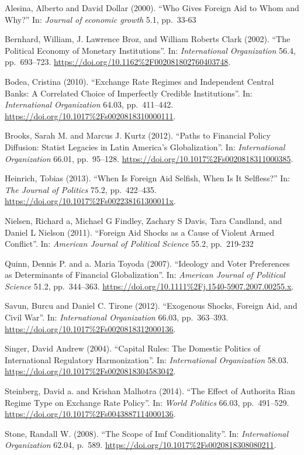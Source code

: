 \documentclass[10pt,]{article}
\begin{document}
Alesina, Alberto and David Dollar (2000). ``Who Gives Foreign Aid to
Whom and Why?'' In: \emph{Journal of economic growth} 5.1, pp.~33-63

Bernhard, William, J. Lawrence Broz, and William Roberts Clark (2002).
``The Political Economy of Monetary Institutions''. In:
\emph{International Organization} 56.4, pp.~693--723.
\url{https://doi.org/10.1162\%2F002081802760403748}.

Bodea, Cristina (2010). ``Exchange Rate Regimes and Independent Central
Banks: A Correlated Choice of Imperfectly Credible Institutions''. In:
\emph{International Organization} 64.03, pp.~411--442.
\url{https://doi.org/10.1017\%2Fs0020818310000111}.

Brooks, Sarah M. and Marcus J. Kurtz (2012). ``Paths to Financial Policy
Diffusion: Statist Legacies in Latin America's Globalization''. In:
\emph{International Organization} 66.01, pp.~95--128.
\url{https://doi.org/10.1017\%2Fs0020818311000385}.

Heinrich, Tobias (2013). ``When Is Foreign Aid Selfish, When Is It
Selfless?'' In: \emph{The Journal of Politics} 75.2, pp.~422--435.
\url{https://doi.org/10.1017\%2Fs002238161300011x}.

Nielsen, Richard a, Michael G Findley, Zachary S Davis, Tara Candland,
and Daniel L Nielson (2011). ``Foreign Aid Shocks as a Cause of Violent
Armed Conflict''. In: \emph{American Journal of Political Science} 55.2,
pp.~219-232

Quinn, Dennis P. and a. Maria Toyoda (2007). ``Ideology and Voter
Preferences as Determinants of Financial Globalization''. In:
\emph{American Journal of Political Science} 51.2, pp.~344--363.
\url{https://doi.org/10.1111\%2Fj.1540-5907.2007.00255.x}.

Savun, Burcu and Daniel C. Tirone (2012). ``Exogenous Shocks, Foreign
Aid, and Civil War''. In: \emph{International Organization} 66.03,
pp.~363--393. \url{https://doi.org/10.1017\%2Fs0020818312000136}.

Singer, David Andrew (2004). ``Capital Rules: The Domestic Politics of
International Regulatory Harmonization''. In:
\emph{International Organization} 58.03.
\url{https://doi.org/10.1017\%2Fs0020818304583042}.

Steinberg, David a. and Krishan Malhotra (2014). ``The Effect of
Authorita Rian Regime Type on Exchange Rate Policy''. In:
\emph{World Politics} 66.03, pp.~491--529.
\url{https://doi.org/10.1017\%2Fs0043887114000136}.

Stone, Randall W. (2008). ``The Scope of Imf Conditionality''. In:
\emph{International Organization} 62.04, p.~589.
\url{https://doi.org/10.1017\%2Fs0020818308080211}.
\end{document}
